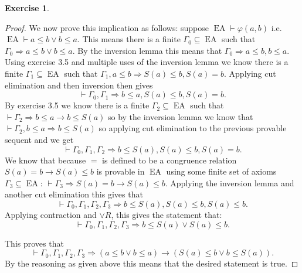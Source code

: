 \documentclass{article}
\newcommand{\sequent}[2]{#1\Rightarrow#2}
\theoremstyle{definition}
\newtheorem{question}{Exercise}
\DeclareMathOperator{\ea}{EA}
\begin{document}
\begin{question}
\begin{proof}
        We now prove this implication as follows: suppose
        \(\ea\vdash\varphi(a,b)\) i.e. \(\ea\vdash a\leq b\vee b\leq a\). This
        means there is a finite \(\Gamma_{0}\subseteq\ea\) such that
        \(\sequent{\Gamma_{0}}{a\leq b\vee b\leq a}\). By the inversion lemma
        this means that \(\sequent{\Gamma_{0}}{a\leq b,b\leq a}\). Using
        exercise 3.5 and multiple uses of the inversion lemma we know there is a
        finite \(\Gamma_{1}\subseteq\ea\) such that \(\sequent{\Gamma_{1},a\leq
            b}{S(a)\leq b,S(a)=b}\). Applying cut elimination and then inversion
        then gives
        \begin{equation}
            \vdash\sequent{\Gamma_{0},\Gamma_{1}}{b\leq a,S(a)\leq b,S(a)=b}. \label{eq:almostthere}
        \end{equation}
        By exercise 3.5 we know there is a finite \(\Gamma_{2}\subseteq\ea\)
        such that \(\vdash\sequent{\Gamma_{2}}{b\leq a\to b\leq S(a)}\) so by
        the inversion lemma we know that \(\vdash\sequent{\Gamma_{2},b\leq a}{b\leq
            S(a)}\) so applying cut elimination to the previous provable sequent
        and  we get
        \begin{equation}
            \vdash\sequent{\Gamma_{0},\Gamma_{1},\Gamma_{2}}{b\leq S(a),S(a)\leq b,S(a)=b}.
        \end{equation}
        We know that because \(=\) is defined to be a congruence relation
        \(S(a)=b\to S(a)\leq b\) is provable in \(\ea\) using some finite set of
        axioms \(\Gamma_{3}\subseteq\ea\):
        \(\vdash\sequent{\Gamma_{3}}{S(a)=b\to S(a)\leq b}\). Applying the
        inversion lemma and another cut elimination this gives that
        \begin{equation}
            \vdash\sequent{\Gamma_{0},\Gamma_{1},\Gamma_{2},\Gamma_{3}}{b\leq S(a),S(a)\leq b,S(a)\leq b}.
        \end{equation}
        Applying contraction and \(\vee R\), this gives the statement that:
        \[
            \vdash\sequent{\Gamma_{0},\Gamma_{1},\Gamma_{2},\Gamma_{3}}{b\leq S(a)\vee S(a)\leq b}.
        \]

        This proves that
        \[
            \vdash\sequent{\Gamma_{0},\Gamma_{1},\Gamma_{2},\Gamma_{3}}{(a\leq b\vee b\leq a)\to(S(a)\leq b\vee b\leq S(a))}.
        \]
        By the reasoning as given above this means that the desired statement is
        true.
    \end{proof}
\end{question}
\end{document}
